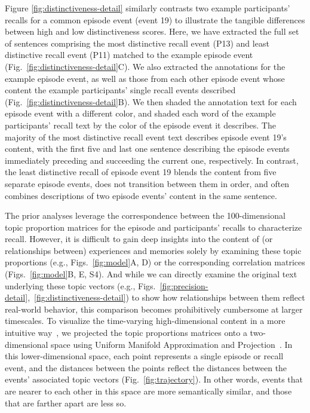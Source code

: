\documentclass{article}
\newcommand{\corrmats}{S4}
\begin{document}
Figure \ref{fig:distinctiveness-detail} similarly contrasts two example participants' recalls for a common episode event (event 19) to illustrate the tangible differences between high and low distinctiveness scores.  Here, we have extracted the full set of sentences comprising the most distinctive recall event (P13) and least distinctive recall event (P11) matched to the example episode event (Fig.~\ref{fig:distinctiveness-detail}C).  We also extracted the annotations for the example episode event, as well as those from each other episode event whose content the example participants' single recall events described (Fig.~\ref{fig:distinctiveness-detail}B).  We then shaded the annotation text for each episode event with a different color, and shaded each word of the example participants' recall text by the color of the episode event it describes.  The majority of the most distinctive recall event text describes episode event 19's content, with the first five and last one sentence describing the episode events immediately preceding and succeeding the current one, respectively.  In contrast, the least distinctive recall of episode event 19 blends the content from five separate episode events, does not transition between them in order, and often combines descriptions of two episode events' content in the same sentence.

The prior analyses leverage the correspondence between the 100-dimensional topic proportion matrices for the episode and participants' recalls to characterize recall.  However, it is difficult to gain deep insights into the content of (or relationships between) experiences and memories solely by examining these topic proportions (e.g., Figs.~\ref{fig:model}A, D) or the corresponding correlation matrices (Figs.~\ref{fig:model}B, E, \corrmats).  And while we can directly examine the original text underlying these topic vectors (e.g., Figs.~\ref{fig:precision-detail},~\ref{fig:distinctiveness-detail}) to show how relationships between them reflect real-world behavior, this comparison becomes prohibitively cumbersome at larger timescales.  To visualize the time-varying high-dimensional content in a more intuitive way~\citep{HeusEtal18a}, we projected the topic proportions matrices onto a two-dimensional space using Uniform Manifold Approximation and Projection~\citep[UMAP; ][]{McInEtal18}.  In this lower-dimensional space, each point represents a single episode or recall event, and the distances between the points reflect the distances between the events' associated topic vectors (Fig.~\ref{fig:trajectory}). In other words, events that are nearer to each other in this space are more semantically similar, and those that are farther apart are less so.
\end{document}
